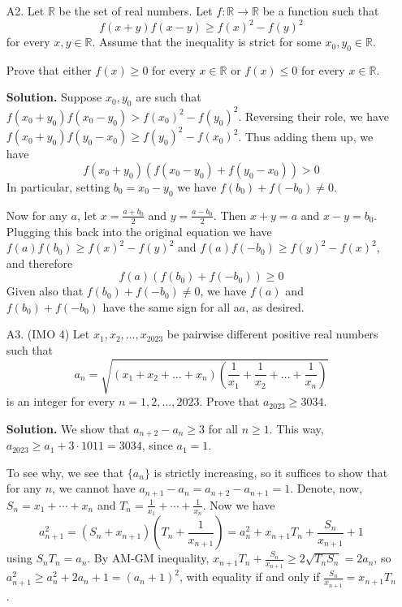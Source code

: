 \documentclass[11pt,a4paper]{article}
\begin{document}
\begin{enumerate}
		\item [A2.] 
		Let $\mathbb{R}$ be the set of real numbers. Let $f:\mathbb{R}\rightarrow\mathbb{R}$ be a function such that\[f(x+y)f(x-y)\geqslant f(x)^2-f(y)^2\]for every $x,y\in\mathbb{R}$. Assume that the inequality is strict for some $x_0,y_0\in\mathbb{R}$.
		
		Prove that either $f(x)\geqslant 0$ for every $x\in\mathbb{R}$ or $f(x)\leqslant 0$ for every $x\in\mathbb{R}$.
		
		\textbf{Solution.}
		Suppose $x_0, y_0$ are such that 
		$f(x_0 + y_0)f(x_0 - y_0) > f(x_0)^2 - f(y_0)^2$. 
		Reversing their role, we have 
		$f(x_0 + y_0)f(y_0 - x_0) \ge f(y_0)^2 - f(x_0)^2$. 
		Thus adding them up, we have 
		\[
		f(x_0 + y_0)(f(x_0 - y_0) + f(y_0 - x_0)) > 0
		\]
		In particular, setting $b_0 = x_0 - y_0$ we have 
		$f(b_0) + f(-b_0)\neq 0$. 
		
		Now for any $a$,
		let $x = \frac{a + b_0}{2}$ and $y = \frac{a - b_0}{2}$. 
		Then $x + y = a$ and $x - y = b_0$. 
		Plugging this back into the original equation we have 
		$f(a)f(b_0)\ge f(x)^2 - f(y)^2$ and 
		$f(a)f(-b_0)\ge f(y)^2 - f(x)^2$, and therefore 
		\[
		f(a)(f(b_0) + f(-b_0))\ge 0
		\]
		Given also that $f(b_0) + f(-b_0)\neq 0$, 
		we have $f(a)$ and $f(b_0) + f(-b_0)$ have the same sign 
		for all a$a$, as desired. 
		
		\item [A3.] (IMO 4)
		Let $x_1,x_2,\dots,x_{2023}$ be pairwise different positive real numbers such that
		\[a_n=\sqrt{(x_1+x_2+\dots+x_n)\left(\frac{1}{x_1}+\frac{1}{x_2}+\dots+\frac{1}{x_n}\right)}\]is an integer for every $n=1,2,\dots,2023.$ Prove that $a_{2023} \geqslant 3034.$
		
		\textbf{Solution.} 
		We show that $a_{n+2} - a_n\ge 3$ for all $n\ge 1$. 
		This way, $a_{2023}\ge a_1 + 3\cdot 1011 = 3034$, 
		since $a_1 = 1$. 
		
		To see why, we see that $\{a_n\}$ is strictly increasing, 
		so it suffices to show that for any $n$, we cannot have $a_{n+1} - a_n = a_{n+2}-a_{n+1}=1$. 
		Denote, now, $S_n = x_1 + \cdots + x_n$ and $T_n = \frac{1}{x_1} + \cdots + \frac{1}{x_n}$. 
		Now we have 
		\[
		a_{n+1}^2 = (S_n + x_{n+1})(T_n + \frac{1}{x_{n+1}})
		=a_n^2 + x_{n+1}T_n + \frac{S_n}{x_{n+1}} + 1
		\]
		using $S_nT_n = a_n$. 
		By AM-GM inequality, $x_{n+1}T_n + \frac{S_n}{x_{n+1}} \ge 2\sqrt{T_nS_n} = 2a_n$, 
		so $a_{n+1}^2 \ge a_n^2 + 2a_n + 1 = (a_n+1)^2$, 
		with equality if and only if $\frac{S_n}{x_{n+1}} = x_{n+1}T_n$.
		

\end{enumerate}
\end{document}
